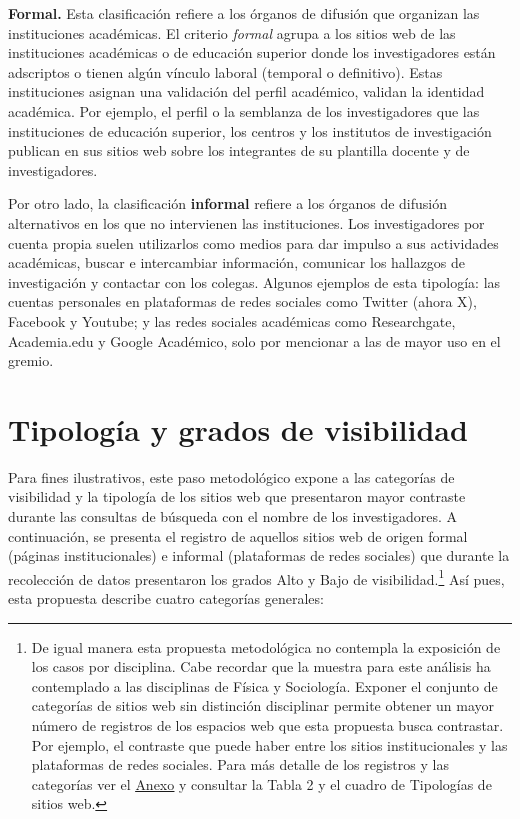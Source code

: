 \documentclass[
]{interact}
\begin{document}
\textbf{Formal.} Esta clasificación refiere a los órganos de difusión
que organizan las instituciones académicas. El criterio \emph{formal}
agrupa a los sitios web de las instituciones académicas o de educación
superior donde los investigadores están adscriptos o tienen algún
vínculo laboral (temporal o definitivo). Estas instituciones asignan una
validación del perfil académico, validan la identidad académica. Por
ejemplo, el perfil o la semblanza de los investigadores que las
instituciones de educación superior, los centros y los institutos de
investigación publican en sus sitios web sobre los integrantes de su
plantilla docente y de investigadores.

Por otro lado, la clasificación \textbf{informal} refiere a los órganos
de difusión alternativos en los que no intervienen las instituciones.
Los investigadores por cuenta propia suelen utilizarlos como medios para
dar impulso a sus actividades académicas, buscar e intercambiar
información, comunicar los hallazgos de investigación y contactar con
los colegas. Algunos ejemplos de esta tipología: las cuentas personales
en plataformas de redes sociales como Twitter (ahora X), Facebook y
Youtube; y las redes sociales académicas como Researchgate, Academia.edu
y Google Académico, solo por mencionar a las de mayor uso en el gremio.

\section{Tipología y grados de
visibilidad}\label{tipologuxeda-y-grados-de-visibilidad}

Para fines ilustrativos, este paso metodológico expone a las categorías
de visibilidad y la tipología de los sitios web que presentaron mayor
contraste durante las consultas de búsqueda con el nombre de los
investigadores. A continuación, se presenta el registro de aquellos
sitios web de origen formal (páginas institucionales) e informal
(plataformas de redes sociales) que durante la recolección de datos
presentaron los grados Alto y Bajo de visibilidad.\footnote{De igual
  manera esta propuesta metodológica no contempla la exposición de los
  casos por disciplina. Cabe recordar que la muestra para este análisis
  ha contemplado a las disciplinas de Física y Sociología. Exponer el
  conjunto de categorías de sitios web sin distinción disciplinar
  permite obtener un mayor número de registros de los espacios web que
  esta propuesta busca contrastar. Por ejemplo, el contraste que puede
  haber entre los sitios institucionales y las plataformas de redes
  sociales. Para más detalle de los registros y las categorías ver el
  \hyperref[_gwhg78ljwimr]{\ul{Anexo}} y consultar la Tabla 2 y el
  cuadro de Tipologías de sitios web.} Así pues, esta propuesta describe
cuatro categorías generales:
\end{document}
